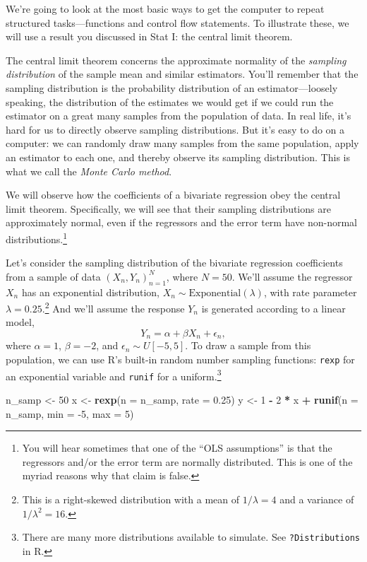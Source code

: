 \documentclass[
  12pt,
  oneside,openany]{book}
\newenvironment{Shaded}{\begin{snugshade}}{\end{snugshade}}
\newcommand{\DataTypeTok}[1]{\textcolor[rgb]{0.13,0.29,0.53}{#1}}
\newcommand{\DecValTok}[1]{\textcolor[rgb]{0.00,0.00,0.81}{#1}}
\newcommand{\FloatTok}[1]{\textcolor[rgb]{0.00,0.00,0.81}{#1}}
\newcommand{\KeywordTok}[1]{\textcolor[rgb]{0.13,0.29,0.53}{\textbf{#1}}}
\newcommand{\NormalTok}[1]{#1}
\newcommand{\OperatorTok}[1]{\textcolor[rgb]{0.81,0.36,0.00}{\textbf{#1}}}
\newcommand{\StringTok}[1]{\textcolor[rgb]{0.31,0.60,0.02}{#1}}
\begin{document}
We're going to look at the most basic ways to get the computer to repeat structured tasks---functions and control flow statements. To illustrate these, we will use a result you discussed in Stat I: the central limit theorem.

The central limit theorem concerns the approximate normality of the \emph{sampling distribution} of the sample mean and similar estimators.
You'll remember that the sampling distribution is the probability distribution of an estimator---loosely speaking, the distribution of the estimates we would get if we could run the estimator on a great many samples from the population of data.
In real life, it's hard for us to directly observe sampling distributions.
But it's easy to do on a computer: we can randomly draw many samples from the same population, apply an estimator to each one, and thereby observe its sampling distribution.
This is what we call the \emph{Monte Carlo method}.

We will observe how the coefficients of a bivariate regression obey the central limit theorem.
Specifically, we will see that their sampling distributions are approximately normal, even if the regressors and the error term have non-normal distributions.\footnote{You will hear sometimes that one of the ``OLS assumptions'' is that the regressors and/or the error term are normally distributed. This is one of the myriad reasons why that claim is false.}

Let's consider the sampling distribution of the bivariate regression coefficients from a sample of data \((X_n, Y_n)_{n=1}^N\), where \(N = 50\).
We'll assume the regressor \(X_n\) has an exponential distribution, \(X_n \sim \text{Exponential}(\lambda)\), with rate parameter \(\lambda = 0.25\).\footnote{This is a right-skewed distribution with a mean of \(1 / \lambda = 4\) and a variance of \(1 / \lambda^2 = 16\).}
And we'll assume the response \(Y_n\) is generated according to a linear model, \[Y_n = \alpha + \beta X_n + \epsilon_n,\] where \(\alpha = 1\), \(\beta = -2\), and \(\epsilon_n \sim U[-5, 5]\).
To draw a sample from this population, we can use R's built-in random number sampling functions: \texttt{rexp} for an exponential variable and \texttt{runif} for a uniform.\footnote{There are many more distributions available to simulate. See \texttt{?Distributions} in R.}

\begin{Shaded}
\begin{Highlighting}[]
\NormalTok{n\_samp \textless{}{-}}\StringTok{ }\DecValTok{50}
\NormalTok{x \textless{}{-}}\StringTok{ }\KeywordTok{rexp}\NormalTok{(}\DataTypeTok{n =}\NormalTok{ n\_samp, }\DataTypeTok{rate =} \FloatTok{0.25}\NormalTok{)}
\NormalTok{y \textless{}{-}}\StringTok{ }\DecValTok{1} \OperatorTok{{-}}\StringTok{ }\DecValTok{2} \OperatorTok{*}\StringTok{ }\NormalTok{x }\OperatorTok{+}\StringTok{ }\KeywordTok{runif}\NormalTok{(}\DataTypeTok{n =}\NormalTok{ n\_samp, }\DataTypeTok{min =} \DecValTok{{-}5}\NormalTok{, }\DataTypeTok{max =} \DecValTok{5}\NormalTok{)}
\end{Highlighting}
\end{Shaded}
\end{document}

